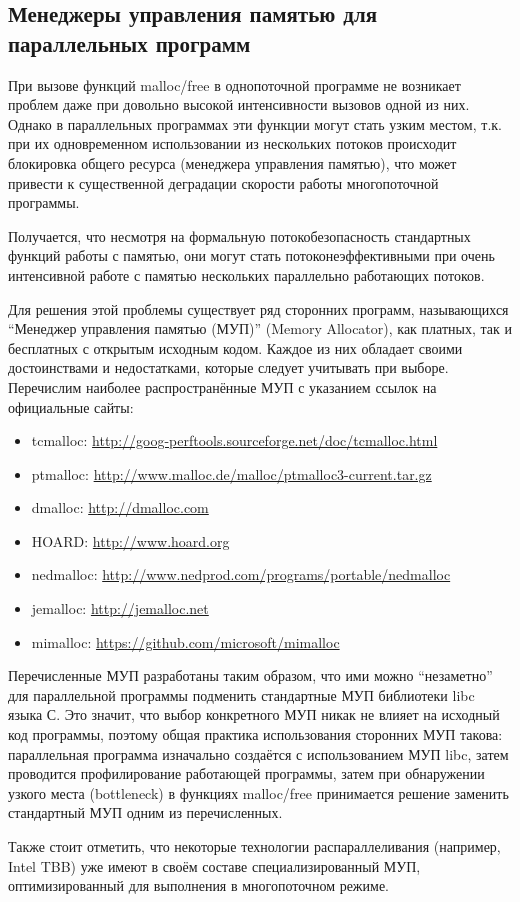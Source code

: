 \subsection{Менеджеры управления памятью для параллельных программ}

При вызове функций malloc/free в однопоточной программе не возникает проблем даже при довольно высокой интенсивности вызовов одной из них. Однако в параллельных программах эти функции могут стать узким местом, т.к. при их одновременном использовании из нескольких потоков происходит блокировка общего ресурса (менеджера управления памятью), что может привести к существенной деградации скорости работы многопоточной программы.

Получается, что несмотря на формальную потокобезопасность стандартных функций работы с памятью, они могут стать потоконеэффективными при очень интенсивной работе с памятью нескольких параллельно работающих потоков.

Для решения этой проблемы существует ряд сторонних программ, называющихся ``Менеджер управления памятью (МУП)'' (Memory Al\-loc\-ator), как платных, так и бесплатных с открытым исходным кодом. Каждое из них обладает своими достоинствами и недостатками, которые следует учитывать при выборе. Перечислим наиболее распространённые МУП с указанием ссылок на официальные сайты:

\begin{itemize}
    \item tcmalloc: \url{http://goog-perftools.sourceforge.net/doc/tcmalloc.html}
    \item ptmalloc: \url{http://www.malloc.de/malloc/ptmalloc3-current.tar.gz}
    \item dmalloc: \url{http://dmalloc.com}
    \item HOARD: \url{http://www.hoard.org}
    \item nedmalloc: \url{http://www.nedprod.com/programs/portable/nedmalloc}
    \item jemalloc: \url{http://jemalloc.net}
    \item mimalloc: \url{https://github.com/microsoft/mimalloc}
\end{itemize}

Перечисленные МУП разработаны таким образом, что ими можно ``незаметно'' для параллельной программы подменить стандартные МУП библиотеки libc языка С. Это значит, что выбор конкретного МУП никак не влияет на исходный код программы, поэтому общая практика использования сторонних МУП такова: параллельная программа изначально создаётся с использованием МУП libc, затем проводится профилирование работающей программы, затем при обнаружении узкого места (bottleneck) в функциях malloc/free принимается решение заменить стандартный МУП одним из перечисленных.

Также стоит отметить, что некоторые технологии распараллеливания (например, Intel TBB) уже имеют в своём составе специализированный МУП, оптимизированный для выполнения в многопоточном режиме.
